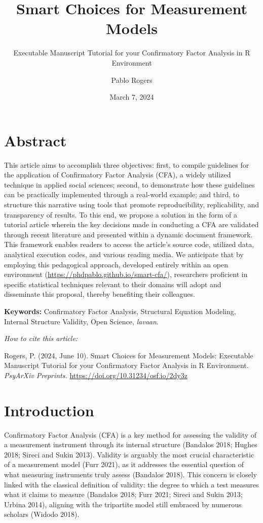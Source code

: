\documentclass[
  a4paper,
]{article}
\title{Smart Choices for Measurement Models}
\subtitle{Executable Manuscript Tutorial for your Confirmatory Factor
Analysis in R Environment}
\author{Pablo Rogers}
\date{March 7, 2024}
\begin{document}
\maketitle


\section*{Abstract}\label{abstract}


This article aims to accomplish three objectives: first, to compile
guidelines for the application of Confirmatory Factor Analysis (CFA), a
widely utilized technique in applied social sciences; second, to
demonstrate how these guidelines can be practically implemented through
a real-world example; and third, to structure this narrative using tools
that promote reproducibility, replicability, and transparency of
results. To this end, we propose a solution in the form of a tutorial
article wherein the key decisions made in conducting a CFA are validated
through recent literature and presented within a dynamic document
framework. This framework enables readers to access the article's source
code, utilized data, analytical execution codes, and various reading
media. We anticipate that by employing this pedagogical approach,
developed entirely within an open environment
(\href{https://github.com/phdpablo/smart-cfa/}{https://phdpablo.github.io/smart-cfa/}),
researchers proficient in specific statistical techniques relevant to
their domains will adopt and disseminate this proposal, thereby
benefiting their colleagues.

\textbf{Keywords:} Confirmatory Factor Analysis, Structural Equation
Modeling, Internal Structure Validity, Open Science, \emph{lavaan}.

\emph{How to cite this article:}

Rogers, P. (2024, June 10). Smart Choices for Measurement Models:
Executable Manuscript Tutorial for your Confirmatory Factor Analysis in
R Environment. \emph{PsyArXiv Preprints.}
\url{https://doi.org/10.31234/osf.io/2dy3z}


\section{Introduction}\label{introduction}

Confirmatory Factor Analysis (CFA) is a key method for assessing the
validity of a measurement instrument through its internal structure
(Bandalos 2018; Hughes 2018; Sireci and Sukin 2013). Validity is
arguably the most crucial characteristic of a measurement model (Furr
2021), as it addresses the essential question of what measuring
instruments truly assess (Bandalos 2018). This concern is closely linked
with the classical definition of validity: the degree to which a test
measures what it claims to measure (Bandalos 2018; Furr 2021; Sireci and
Sukin 2013; Urbina 2014), aligning with the tripartite model still
embraced by numerous scholars (Widodo 2018).
\end{document}
